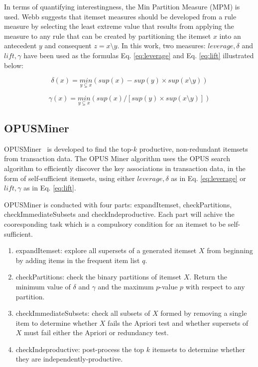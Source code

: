 \begin{definition}
\label{df:indprod}
In terms of quantifying interestingness, the Min Partition Measure (MPM) is used. Webb \cite{ssi} suggests that itemset measures should be developed from a rule measure by selecting the least extreme value that results from applying the measure to any rule that can be created by partitioning the itemset $x$ into an antecedent $y$ and consequent $z = x \setminus y$. In this work, two measures: $leverage, \delta$ and $lift, \gamma$ have been used as the formulas Eq. \ref{eq:leverage} and Eq. \ref{eq:lift} illustrated below:

\begin{equation}
\label{eq:leverage}
\delta(x) = \underset{y \subsetneq x}{min}(sup(x)-sup(y)\times sup(x \setminus y))
\end{equation}

\begin{equation}
\label{eq:lift}
\gamma(x) = \underset{y \subsetneq x}{min}(sup(x)/ [sup(y)\times sup(x \setminus y)])
\end{equation}

\end{definition}

\subsection{OPUSMiner}
OPUSMiner~\cite{patternwebb} is developed to find the top-$k$ productive, non-redundant itemsets from transaction data. The OPUS Miner algorithm uses the OPUS search algorithm to efficiently discover the key associations in transaction data, in the form of self-sufficient itemsets, using either $leverage, \delta$ as in Eq. \ref{eq:leverage} or $lift, \gamma$ as in Eq. \ref{eq:lift}.

OPUSMiner is conducted with four parts: expandItemset, checkPartitions, checkImmediateSubsets and checkIndeproductive. Each part will achive the cooresponding task which is a compulsory condition for an itemset to be self-sufficient.

\begin{enumerate}
    \item expandItemset: explore all supersets of a generated itemset $X$ from beginning by adding items in the frequent item list $q$.
    \item checkPartitions: check the binary partitions of itemset $X$. Return the minimum value of $\delta $ and $ \gamma$ and the maximum $p$-value $p$ with respect to any partition.
    \item checkImmediateSubsets: check all subsets of $X$ formed by removing a single item to determine whether $X$ fails the Apriori test and whether supersets of $X$ must fail either the Apriori or redundancy test.
    \item checkIndeproductive: post-process the top $k$ itemsets to determine whether they are independently-productive.
\end{enumerate}

